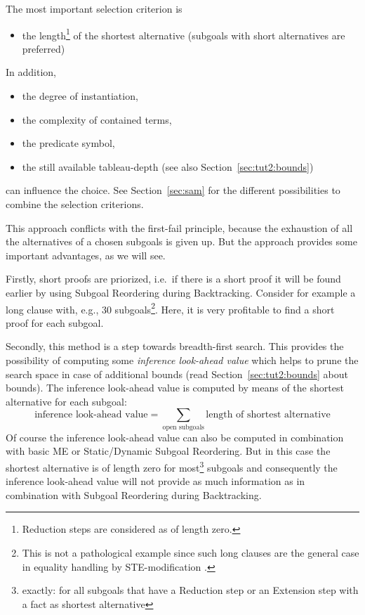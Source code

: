 The most important selection criterion is 
\begin{itemize}
\item the length\footnote{Reduction steps are considered as of length
		zero.} 
	of the shortest alternative (subgoals with short alternatives
	are preferred) 
\end{itemize}
In addition,
\begin{itemize}
\item the degree of instantiation,
\item the complexity of contained terms,
\item the predicate symbol,
\item the still available tableau-depth (see
	also Section~\ref{sec:tut2:bounds})
\end{itemize}
can influence the choice. See Section~\ref{sec:sam} for the different
possibilities to combine the selection criterions.

This approach conflicts with the first-fail principle, because the
exhaustion of all the alternatives of a chosen subgoals is given
up. But the approach provides some important advantages, as we will
see. 

Firstly, short proofs are priorized, i.e.\ if there is a short proof
it will be found earlier by using Subgoal Reordering during
Backtracking. Consider for example a long clause with, e.g., 30
subgoals\footnote{This is not a pathological example since such long
	clauses are the general case in equality handling by
STE-modification \cite{}.}. 
Here, it is very profitable to find a short proof for each subgoal.

Secondly, this method is a step towards breadth-first search. This
provides the possibility of computing some {\em inference look-ahead
value\/} which helps to prune the search space in case of additional
bounds (read Section~\ref{sec:tut2:bounds} about bounds). The
inference look-ahead value is computed by means of the shortest
alternative for each subgoal:
\begin{displaymath}
\mbox{inference look-ahead value} = \sum_{\mbox{open subgoals}} \mbox{length of shortest alternative}
\end{displaymath}
Of course the inference look-ahead value can also be computed in
combination with basic ME or Static/Dynamic Subgoal Reordering. But in
this case the shortest alternative is of length zero for
most\footnote{exactly: for all subgoals that have a Reduction step or
	an Extension step with a fact as shortest alternative} 
subgoals and consequently the inference look-ahead value will not
provide as much information as in combination with Subgoal Reordering
during Backtracking. 

